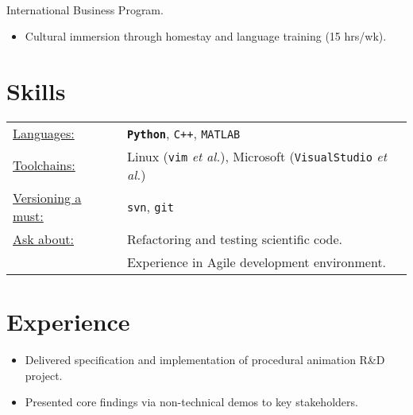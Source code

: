 \documentclass[margin, a4paper]{res}
\begin{document}
\begin{sloppypar}
\begin{resume}
\begin{itemize}


    \end{itemize}

\\
International Business Program.
    \begin{itemize}
        \item Cultural immersion through homestay and language training (15 hrs/wk). 
    \end{itemize}

\section{Skills}
\begin{tabular}{l p{3in}}
    \underline{Languages:} & \textbf{\texttt{Python}}, \texttt{C++}, \textsc{\texttt{MATLAB}} \\
    \underline{Toolchains:} & Linux (\texttt{vim} \textit{et al.}), Microsoft (\texttt{VisualStudio} \textit{et al.}) \\
    \underline{Versioning a must:} & \texttt{svn}, \texttt{git} \\
    \underline{Ask about:} & Refactoring and testing scientific code. \\
                           & Experience in Agile development environment.
\end{tabular}

\section{Experience}
\begin{itemize}
\item Delivered specification and implementation of procedural animation R\&D project.
\item Presented core findings via non-technical demos to key stakeholders.


\end{itemize}
\end{resume}
\end{sloppypar}
\end{document}
